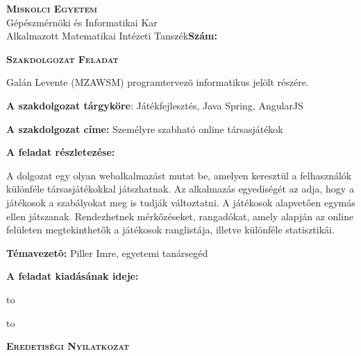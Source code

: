 \begin{flushleft}
	\textsc{\bfseries Miskolci Egyetem}\\
	Gépészmérnöki és Informatikai Kar\\
	Alkalmazott Matematikai Intézeti Tanszék\hspace*{4cm}\hfil \textbf{Szám:}
\end{flushleft}
\vskip 0.5cm
\begin{center}
	\large\textsc{\bfseries Szakdolgozat Feladat}
\end{center}
\vskip 0.5cm
Galán Levente (MZAWSM) programtervezõ informatikus jelölt részére.\newline

\noindent\textbf{A szakdolgozat tárgyköre}: Játékfejlesztés, Java Spring, AngularJS \newline

\noindent\textbf{A szakdolgozat címe:} Személyre szabható online társasjátékok \newline

\noindent\textbf{A feladat részletezése:}

\noindent A dolgozat egy olyan webalkalmazást mutat be, amelyen keresztül a felhasználók különféle társasjátékokkal játszhatnak.
\noindent Az alkalmazás egyediségét az adja, hogy a játékosok a szabályokat meg is tudják változtatni.
\noindent A játékosok alapvetően egymás ellen játszanak.
\noindent Rendezhetnek mérkőzéseket, rangadókat, amely alapján az online felületen megtekinthetők a játékosok ranglistája, illetve különféle statisztikái.

\vfill

\noindent\textbf{Témavezetõ:} Piller Imre, egyetemi tanársegéd\newline

\noindent\textbf{A feladat kiadásának ideje:}\newline


\vskip 2cm

\hbox to 

\hbox to 


\newpage

\vspace*{1cm}  
\begin{center}
\large\textsc{\bfseries Eredetiségi Nyilatkozat}
\end{center}
\vspace*{2cm}

